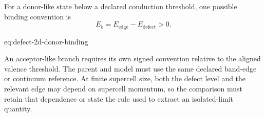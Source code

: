 For a donor-like state below a declared conduction threshold, one possible
binding convention is
\begin{equation}
    E_b
    =
    E_{\mathrm{edge}}-E_{\mathrm{defect}}>0.
    \label{eq:defect-2d-donor-binding}
\end{equation}
\begin{equationterms}{eq:defect-2d-donor-binding}
\end{equationterms}
An acceptor-like branch requires its own signed convention relative to the
aligned valence threshold. The parent and model must use the same declared
band-edge or continuum reference. At finite supercell size, both the defect
level and the relevant edge may depend on supercell momentum, so the comparison
must retain that dependence or state the rule used to extract an isolated-limit
quantity.

